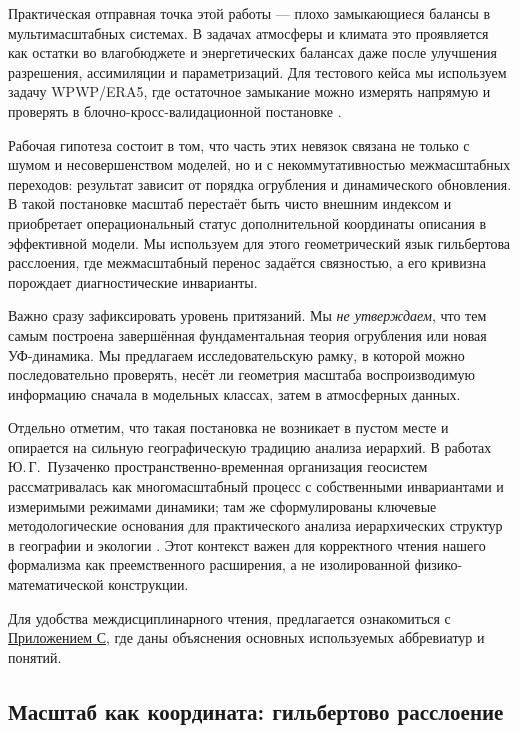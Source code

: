 \documentclass[11pt,a4paper]{article}
\theoremstyle{definition}
\theoremstyle{plain}
\theoremstyle{remark}
\begin{document}
Практическая отправная точка этой работы --- плохо замыкающиеся балансы в мультимасштабных системах. В задачах атмосферы и климата это проявляется как остатки во влагобюджете и энергетических балансах даже после улучшения разрешения, ассимиляции и параметризаций. Для тестового кейса мы используем задачу WPWP/ERA5, где остаточное замыкание можно измерять напрямую и проверять в блочно-кросс-валидационной постановке \cite{Hersbach2020ERA5,CopernicusC3S2017ERA5,PeixotoOort1992PhysicsClimate,TrenberthEtAl2007WaterBudget}.

Рабочая гипотеза состоит в том, что часть этих невязок связана не только с шумом и несовершенством моделей, но и с некоммутативностью межмасштабных переходов: результат зависит от порядка огрубления и динамического обновления. В такой постановке масштаб перестаёт быть чисто внешним индексом и приобретает операциональный статус дополнительной координаты описания в эффективной модели. Мы используем для этого геометрический язык гильбертова расслоения, где межмасштабный перенос задаётся связностью, а его кривизна порождает диагностические инварианты.

Важно сразу зафиксировать уровень притязаний. Мы \emph{не утверждаем}, что тем самым построена завершённая фундаментальная теория огрубления или новая УФ-динамика. Мы предлагаем исследовательскую рамку, в которой можно последовательно проверять, несёт ли геометрия масштаба воспроизводимую информацию сначала в модельных классах, затем в атмосферных данных.

Отдельно отметим, что такая постановка не возникает в пустом месте и опирается на сильную географическую традицию анализа иерархий. В работах Ю.\,Г.~Пузаченко пространственно-временная организация геосистем рассматривалась как многомасштабный процесс с собственными инвариантами и измеримыми режимами динамики; там же сформулированы ключевые методологические основания для практического анализа иерархических структур в географии и экологии \cite{Puzachenko1986Hierarchy,Puzachenko2004Methods,Puzachenko2010Invariants}. Этот контекст важен для корректного чтения нашего формализма как преемственного расширения, а не изолированной физико-математической конструкции.

Для удобства междисциплинарного чтения, предлагается ознакомиться с \hyperref[sec:appendix:glossary]{Приложением С}, где даны объяснения основных используемых аббревиатур и понятий.

\subsection{Масштаб как координата: гильбертово расслоение}
\end{document}
